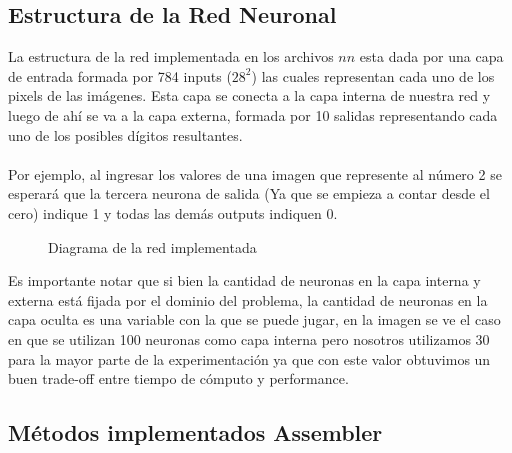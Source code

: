 \subsection{Estructura de la Red Neuronal}

La estructura de la red implementada en los archivos $nn$ esta dada por una capa de entrada formada por 784 inputs ($28^2$) las cuales representan cada uno de los pixels de las imágenes. Esta capa se conecta a la capa interna de nuestra red y luego de ahí se va a la capa externa, formada por 10 salidas representando cada uno de los posibles dígitos resultantes.
\\
\\
Por ejemplo, al ingresar los valores de una imagen que represente al número 2 se esperará que la tercera neurona de salida (Ya que se empieza a contar desde el cero) indique 1 y todas las demás outputs indiquen 0.

\begin{figure}[H]
\centering
\caption{Diagrama de la red implementada}
\centering
\end{figure}

Es importante notar que si bien la cantidad de neuronas en la capa interna y externa está fijada por el dominio del problema, la cantidad de neuronas en la capa oculta es una variable con la que se puede jugar, en la imagen se ve el caso en que se utilizan 100 neuronas como capa interna pero nosotros utilizamos 30 para la mayor parte de la experimentación ya que con este valor obtuvimos un buen trade-off entre tiempo de cómputo y performance.

\subsection{Métodos implementados Assembler}

